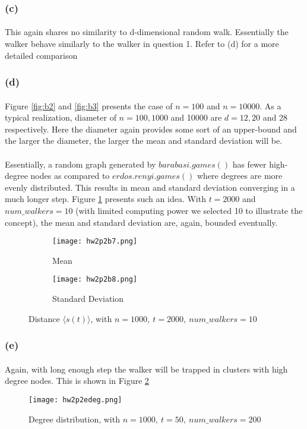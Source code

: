 \subsubsection*{(c)}
\paragraph{}
This again shares no similarity to d-dimensional random walk. Essentially the walker behave similarly to the walker in question 1. Refer to (d) for a more detailed comparison
\subsubsection*{(d)}
\paragraph{}
Figure \ref{fig:b2} and \ref{fig:b3} presents the case of $n = 100$ and $n = 10000$. As a typical realization, diameter of $n = 100, 1000$ and 10000 are $d = 12, 20$ and 28 respectively. Here the diameter again provides some sort of an upper-bound and the larger the diameter, the larger the mean and standard deviation will be.
\paragraph{}
Essentially, a random graph generated by $barabasi.games()$ has fewer high-degree nodes as compared to $erdos.renyi.games()$ where degrees are more evenly distributed. This results in mean and standard deviation converging in a much longer step. Figure \ref{fig:b4} presents such an idea. With $t=2000$ and $num\_walkers =10$ (with limited computing power we selected 10 to illustrate the concept), the mean and standard deviation are, again, bounded eventually.

\begin{figure}[h!]
	\centering
	\begin{subfigure}{.5\textwidth}
		\centering
		\texttt{[image: hw2p2b7.png]}
		\caption{Mean}
	\end{subfigure}%
	\begin{subfigure}{.5\textwidth}
		\centering
		\texttt{[image: hw2p2b8.png]}
		\caption{Standard Deviation}
	\end{subfigure}
	\caption{Distance $\langle s(t)\rangle$, with $n = 1000,\ t = 2000,\ num\_walkers = 10$}
	\label{fig:b4}
\end{figure}

\subsubsection*{(e)}
\paragraph{}
Again, with long enough step the walker will be trapped in clusters with high degree nodes. This is shown in Figure \ref{fig:b5}


\begin{figure} [h!]
	\centering
	\texttt{[image: hw2p2edeg.png]}
	\caption{Degree distribution, with $n = 1000,\ t = 50,\ num\_walkers = 200$}
	\label{fig:b5}
\end{figure}
